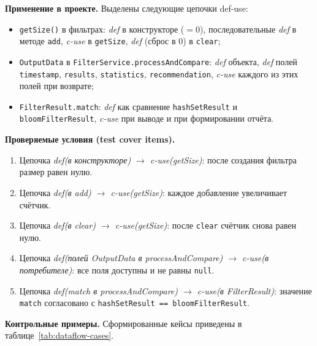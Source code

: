 \textbf{Применение в проекте.} Выделены следующие цепочки def-use:
\begin{itemize}
    \item \texttt{getSize()} в фильтрах: \textit{def} в конструкторе ($=0$), последовательные \textit{def} в методе \texttt{add}, \textit{c-use} в \texttt{getSize}, \textit{def} (сброс в 0) в \texttt{clear};
    \item \texttt{OutputData} в \texttt{FilterService.processAndCompare}: \textit{def} объекта, \textit{def} полей \texttt{timestamp}, \texttt{results}, \texttt{statistics}, \texttt{recommendation}, \textit{c-use} каждого из этих полей при возврате;
    \item \texttt{FilterResult.match}: \textit{def} как сравнение \texttt{hashSetResult} и \texttt{bloomFilterResult}, \textit{c-use} при выводе и при формировании отчёта.
\end{itemize}

\textbf{Проверяемые условия (test cover items).}
\begin{enumerate}
    \item Цепочка \textit{def(в конструкторе) $\to$ c-use(getSize)}: после создания фильтра размер равен нулю.
    \item Цепочка \textit{def(в add) $\to$ c-use(getSize)}: каждое добавление увеличивает счётчик.
    \item Цепочка \textit{def(в clear) $\to$ c-use(getSize)}: после \texttt{clear} счётчик снова равен нулю.
    \item Цепочка \textit{def(полей OutputData в processAndCompare) $\to$ c-use(в потребителе)}: все поля доступны и не равны \texttt{null}.
    \item Цепочка \textit{def(match в processAndCompare) $\to$ c-use(в FilterResult)}: значение \texttt{match} согласовано с \texttt{hashSetResult == bloomFilterResult}.
\end{enumerate}

\textbf{Контрольные примеры.} Сформированные кейсы приведены в таблице~\ref{tab:dataflow-cases}.


